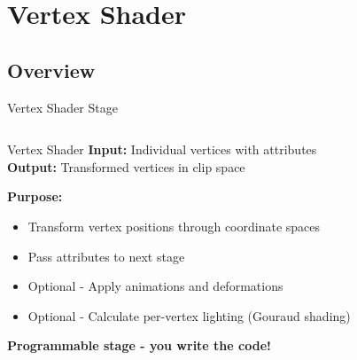 \section{Vertex Shader}

\subsection{Overview}
\begin{frame}{Vertex Shader Stage}
  \small
  \begin{columns}
    \begin{column}{0.7\textwidth}
      \footnotesize
      \begin{raybox}{Vertex Shader}
        \textbf{Input:} Individual vertices with attributes \\
        \textbf{Output:} Transformed vertices in clip space

        \vspace{0.3cm}
        \textbf{Purpose:}
        \begin{itemize}
          \item Transform vertex positions through coordinate spaces
          \item Pass attributes to next stage
          \item Optional - Apply animations and deformations
          \item Optional - Calculate per-vertex lighting (Gouraud shading)
        \end{itemize}

        \vspace{0.2cm}
        \textcolor{PrimaryColor}{\textbf{Programmable stage - you write the code!}}
      \end{raybox}
    \end{column}
    \begin{column}{0.3\textwidth}
\end{column}
\end{columns}
\end{frame}
